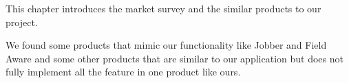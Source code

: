 This chapter introduces the market survey and the similar products to our project.

We found some products that mimic our functionality like Jobber and Field Aware and some other products that are similar to our application but does not fully implement all the feature in one product like ours. 